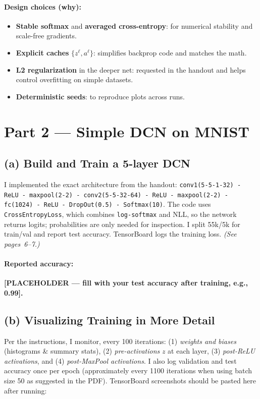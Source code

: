 \documentclass[11pt]{article}
\begin{document}
\paragraph{Design choices (why):}
\begin{itemize}[leftmargin=1.2em]
  \item \textbf{Stable softmax} and \textbf{averaged cross-entropy}: for numerical stability and scale-free gradients.
  \item \textbf{Explicit caches} \(\{z^\ell,a^\ell\}\): simplifies backprop code and matches the math.
  \item \textbf{L2 regularization} in the deeper net: requested in the handout and helps control overfitting on simple datasets.
  \item \textbf{Deterministic seeds}: to reproduce plots across runs.
\end{itemize}

\section{Part 2 --- Simple DCN on MNIST}
\subsection{(a) Build and Train a 5-layer DCN}
I implemented the exact architecture from the handout: \texttt{conv1(5-5-1-32) - ReLU - maxpool(2-2) - conv2(5-5-32-64) - ReLU - maxpool(2-2) - fc(1024) - ReLU - DropOut(0.5) - Softmax(10)}. The code uses \texttt{CrossEntropyLoss}, which combines \texttt{log-softmax} and NLL, so the network returns logits; probabilities are only needed for inspection. I split 55k/5k for train/val and report test accuracy. TensorBoard logs the training loss. \textit{(See pages~6--7.)}

\paragraph{Reported accuracy:} \textbf{[PLACEHOLDER --- fill with your test accuracy after training, e.g., 0.99].}

\subsection{(b) Visualizing Training in More Detail}
Per the instructions, I monitor, every 100 iterations: (1) \emph{weights and biases} (histograms \& summary stats), (2) \emph{pre-activations} \(z\) at each layer, (3) \emph{post-ReLU activations}, and (4) \emph{post-MaxPool activations}. I also log validation and test accuracy once per epoch (approximately every 1100 iterations when using batch size 50 as suggested in the PDF). TensorBoard screenshots should be pasted here after running:
\begin{center}
\end{center}
\end{document}
